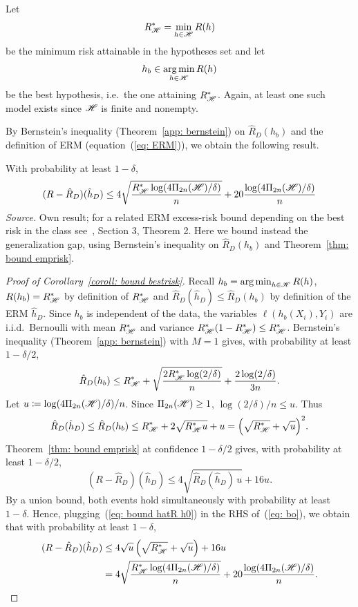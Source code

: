 \documentclass[reqno]{amsart}
\begin{document}
Let
\[
R^*_{\mathscr{H}} = \min_{h\in\mathscr{H}} R(h)
\]
be the minimum risk attainable in the hypotheses set
and let \[
h_b \in \operatorname*{arg\,min}_{h\in\mathscr{H}} R(h)
\]
be the best hypothesis, i.e.\ the one attaining $R^*_{\mathscr{H}}$. Again, at least one such model exists since $\mathscr{H}$ is finite and nonempty. 

By Bernstein's inequality (Theorem~\ref{app: bernstein}) on $\hat R_D(h_b)$ and the definition of ERM (equation~(\ref{eq: ERM})), we obtain the following result. 

\begin{corollary}\label{coroll: bound bestrisk}
    With probability at least $1-\delta$,
    \[
    (R - \hat R_D)(\hat h_D) \le 4\sqrt{\frac{R^*_{\mathscr{H}}\log(4\Pi_{2n}(\mathscr{H})/\delta)}{n}} + 20\frac{\log(4\Pi_{2n}(\mathscr{H})/\delta)}{n}
    \]
\textnormal{\emph{Source.} Own result; for a related ERM excess-risk bound depending on the best risk in the class see~\cite{bartlett1999inequality}, Section 3, Theorem 2. Here we bound instead the generalization gap, using Bernstein's inequality on $\hat R_D(h_b)$ and Theorem~\ref{thm: bound emprisk}.}

\begin{proof}[Proof of Corollary~\ref{coroll: bound bestrisk}]
        Recall $h_b = \operatorname*{arg\,min}_{h\in\mathscr{H}} R(h)$, $R(h_b) = R^*_{\mathscr{H}}$ by definition of $R^*_{\mathscr{H}}$ and $\hat R_D(\hat h_D) \le \hat R_D(h_b)$ by definition of the ERM $\hat h_D$.
        Since $h_b$ is independent of the data, the variables $\ell(h_b(X_i),Y_i)$ are i.i.d.\ Bernoulli with mean $R^*_{\mathscr{H}}$ and variance $R^*_{\mathscr{H}}(1-R^*_{\mathscr{H}}) \le R^*_{\mathscr{H}}$. Bernstein's inequality (Theorem~\ref{app: bernstein}) with $M=1$ gives, with probability at least $1-\delta/2$,
        \[
        \hat R_D(h_b) \le R^*_{\mathscr{H}} + \sqrt{\frac{2R^*_{\mathscr{H}} \log (2/\delta)}{n}} + \frac{2\log(2/\delta)}{3n}.
        \]
        Let $u\coloneq\log(4\Pi_{2n}(\mathscr{H})/\delta)/n$. Since $\Pi_{2n}(\mathscr{H})\ge 1$, $\log(2/\delta)/n\le u$. Thus
        \begin{equation}\label{eq: bound hatR h0}
        \hat R_D(\hat h_D) \le \hat R_D(h_b) \le R^*_{\mathscr{H}} + 2\sqrt{R^*_{\mathscr{H}} u} + u = {\left(\sqrt{R^*_{\mathscr{H}}} + \sqrt{u}\right)}^2.
        \end{equation}
        Theorem~\ref{thm: bound emprisk} at confidence $1-\delta/2$ gives, with probability at least $1-\delta/2$,
        \begin{equation}\label{eq: bo}
        (R-\hat R_D)(\hat h_D) \le 4\sqrt{\hat R_D(\hat h_D)\,u} + 16u.
        \end{equation}
        By a union bound, both events hold simultaneously with probability at least $1-\delta$. Hence, plugging~(\ref{eq: bound hatR h0}) in the RHS of~(\ref{eq: bo}), we obtain that with probability at least $1-\delta$,
        \begin{align*}
        (R-\hat R_D)(\hat h_D) &\le 4\sqrt u\left(\sqrt{R^*_{\mathscr{H}}} + \sqrt u\right) + 16u \\
        &= 4\sqrt{\frac{R^*_{\mathscr{H}}\log(4\Pi_{2n}(\mathscr{H})/\delta)}{n}} + 20\frac{\log(4\Pi_{2n}(\mathscr{H})/\delta)}{n}.
        \end{align*}
\end{proof}
\end{corollary}
\end{document}
